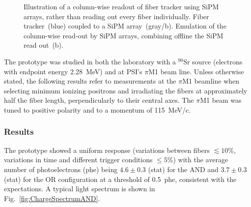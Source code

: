 \begin{refsection}
        \begin{figure}
            \centering
            \hspace{0.2\columnwidth}
            \caption[SciFi prototype: fiber layers]{Illustration of a column-wise readout of fiber tracker using SiPM arrays, rather than reading out every fiber individually. Fiber tracker~(blue) coupled to a SiPM array~(gray/b). Emulation of the column-wise read-out by SiPM arrays, combining offline the SiPM read out~(b).}
            \label{fig:sipmarray}
        \end{figure}

        \noindent
        The prototype was studied in both the laboratory with a $^{90}$Sr source (electrons with endpoint energy \SI{2.28}{MeV}) and at PSI's $\pi$M1 beam line. 
        Unless otherwise stated, the following results refer to measurements at the $\pi$M1 beamline when selecting minimum ionizing positrons and irradiating the fibers at approximately half the fiber length, perpendicularly to their central axes. 
        The $\pi$M1 beam was tuned to positive polarity and to a momentum of \SI{115}{MeV/c}.

        \subsubsection{Results}
        The prototype showed a uniform response (variations between fibers $\lesssim10$\thinspace\%, variations in time and different trigger conditions $\leq 5$\thinspace\%) with the average number of photoelectrons (phe) being $4.6\pm0.3$ (stat) for the AND and $3.7\pm0.3$ (stat) for the OR configuration at a threshold of 0.5~phe, consistent with the expectations. A typical light spectrum is shown in Fig.~\ref{fig:ChargeSpectrumAND}.


\end{refsection}
